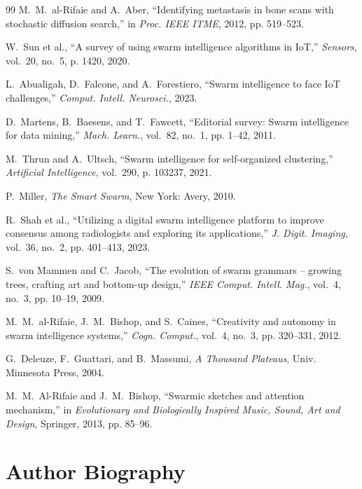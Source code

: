 \documentclass[journal,compsoc]{IEEEtran}
\begin{document}
\begin{thebibliography}{99}
M.~M.~al-Rifaie and A.~Aber, ``Identifying metastasis in bone scans with stochastic diffusion search,'' in \emph{Proc. IEEE ITME}, 2012, pp. 519--523.

W.~Sun et al., ``A survey of using swarm intelligence algorithms in {IoT},'' \emph{Sensors}, vol.~20, no.~5, p. 1420, 2020.

L.~Abualigah, D.~Falcone, and A.~Forestiero, ``Swarm intelligence to face {IoT} challenges,'' \emph{Comput. Intell. Neurosci.}, 2023.

D.~Martens, B.~Baesens, and T.~Fawcett, ``Editorial survey: Swarm intelligence for data mining,'' \emph{Mach. Learn.}, vol.~82, no.~1, pp. 1--42, 2011.

M.~Thrun and A.~Ultsch, ``Swarm intelligence for self-organized clustering,'' \emph{Artificial Intelligence}, vol.~290, p. 103237, 2021.

P.~Miller, \emph{The Smart Swarm}, New York: Avery, 2010.

R.~Shah et al., ``Utilizing a digital swarm intelligence platform to improve consensus among radiologists and exploring its applications,'' \emph{J. Digit. Imaging}, vol.~36, no.~2, pp. 401--413, 2023.

S.~von Mammen and C.~Jacob, ``The evolution of swarm grammars -- growing trees, crafting art and bottom-up design,'' \emph{IEEE Comput. Intell. Mag.}, vol.~4, no.~3, pp. 10--19, 2009.

M.~M.~al-Rifaie, J.~M.~Bishop, and S.~Caines, ``Creativity and autonomy in swarm intelligence systems,'' \emph{Cogn. Comput.}, vol.~4, no.~3, pp. 320--331, 2012.

G.~Deleuze, F.~Guattari, and B.~Massumi, \emph{A Thousand Plateaus}, Univ. Minnesota Press, 2004.

M.~M.~Al-Rifaie and J.~M.~Bishop, ``Swarmic sketches and attention mechanism,'' in \emph{Evolutionary and Biologically Inspired Music, Sound, Art and Design}, Springer, 2013, pp. 85--96.

\end{thebibliography}

\section*{Author Biography}
\vspace{-7ex} 
\end{document}
